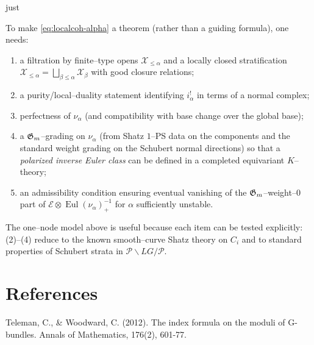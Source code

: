just \documentclass[12pt]{article}
\DeclareMathOperator{\Eul}{Eul}
\begin{document}
\begin{remark}
To make \eqref{eq:localcoh-alpha} a theorem (rather than a guiding formula), one needs:
\begin{enumerate}[(1)]
\item a filtration by finite--type opens $\mathcal X_{\le\alpha}$ and a locally closed stratification
$\mathcal X_{\le\alpha}=\bigsqcup_{\beta\le\alpha}\mathcal X_\beta$ with good closure relations;
\item a purity/local--duality statement identifying $i_\alpha^!$ in terms of a normal complex;
\item perfectness of $\nu_\alpha$ (and compatibility with base change over the global base);
\item a $\mathfrak{G}_m$--grading on $\nu_\alpha$ (from Shatz $1$--PS data on the components and the standard
weight grading on the Schubert normal directions) so that a \emph{polarized inverse Euler class}
can be defined in a completed equivariant $K$--theory;
\item an admissibility condition ensuring eventual vanishing of the $\mathfrak{G}_m$--weight--$0$ part of
$\mathcal E\otimes \Eul(\nu_\alpha)^{-1}_+$ for $\alpha$ sufficiently unstable.
\end{enumerate}
The one--node model above is useful because each item can be tested explicitly:
(2)--(4) reduce to the known smooth--curve Shatz theory on $C_i$ and to standard properties
of Schubert strata in $\mathcal P\backslash LG/\mathcal P$.
\end{remark}
\section{References}
\begin{enumerate}
     Teleman, C., \& Woodward, C. (2012). The index formula on the moduli of G-bundles. Annals of Mathematics, 176(2), 601-77.
\end{enumerate}
\end{document}
